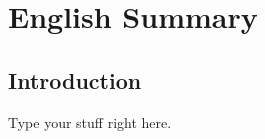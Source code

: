 \chapter*{English Summary}
\renewcommand\thesection{\arabic{section}}
\label{chap:ENG}

\section{Introduction}
\label{sec:ENGintro}

\par
Type your stuff right here.
